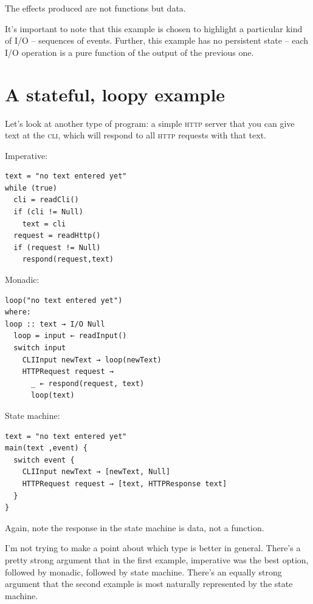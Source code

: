 \documentclass[twoside]{article}
\begin{document}
\noindent
The effects produced are not functions but data.

It's important to note that this example is chosen to highlight a
particular kind of I/O -- sequences of events. Further, this example has
no persistent state -- each I/O operation is a pure function of the
output of the previous one.

\section{A stateful, loopy example}\label{a-stateful-loopy-example}

Let's look at another type of program: a simple \textsc{http} server that you can
give text at the \textsc{cli}, which will respond to all \textsc{http} requests with that
text.

\noindent
Imperative:

\begin{lstlisting}[style=listingblock]
text = "no text entered yet"
while (true)
  cli = readCli()
  if (cli != Null)
    text = cli
  request = readHttp()
  if (request != Null)
    respond(request,text)
\end{lstlisting}

\noindent
Monadic:

\begin{lstlisting}[style=listingblock]
loop("no text entered yet")
where:
loop :: text → I/O Null
  loop = input ← readInput()
  switch input
    CLIInput newText → loop(newText)
    HTTPRequest request →
      _ ← respond(request, text)
      loop(text)
\end{lstlisting}

\noindent
State machine:

\begin{lstlisting}[style=listingblock]
text = "no text entered yet"
main(text ,event) {
  switch event {
    CLIInput newText → [newText, Null]
    HTTPRequest request → [text, HTTPResponse text]
  }
}
\end{lstlisting}

\noindent
Again, note the response in the state machine is data, not a function.

I'm not trying to make a point about which type is better in general.
There's a pretty strong argument that in the first example, imperative
was the best option, followed by monadic, followed by state machine.
There's an equally strong argument that the second example is most
naturally represented by the state machine.
\end{document}
